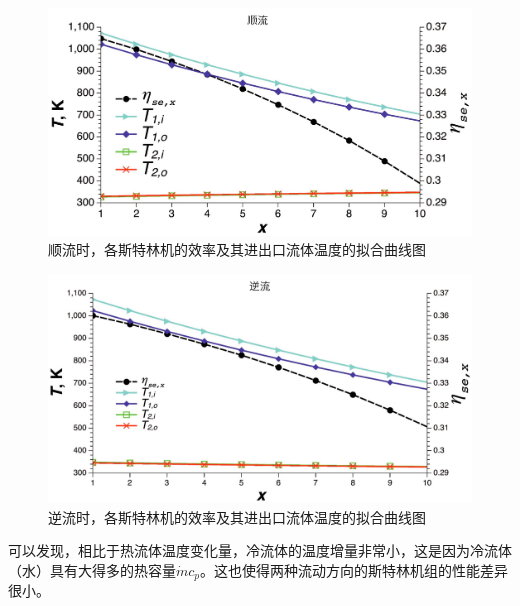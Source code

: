 \begin{figure}[hbp]
\begin{center}
	\includegraphics[width = 0.8\columnwidth]{fig/Parallelflow.pdf}
	\caption{顺流时，各斯特林机的效率及其进出口流体温度的拟合曲线图}
	\label{fig:Parallelflow}
\end{center}
\end{figure}

\begin{figure}[htbp]
\begin{center}
	\includegraphics[width = 0.8\columnwidth]{fig/Counterflow.pdf}
	\caption{逆流时，各斯特林机的效率及其进出口流体温度的拟合曲线图}
	\label{fig:Counterflow}
\end{center}
\end{figure}

可以发现，相比于热流体温度变化量，冷流体的温度增量非常小，这是因为冷流体（水）具有大得多的热容量$\dot{m}c_p$。这也使得两种流动方向的斯特林机组的性能差异很小。

